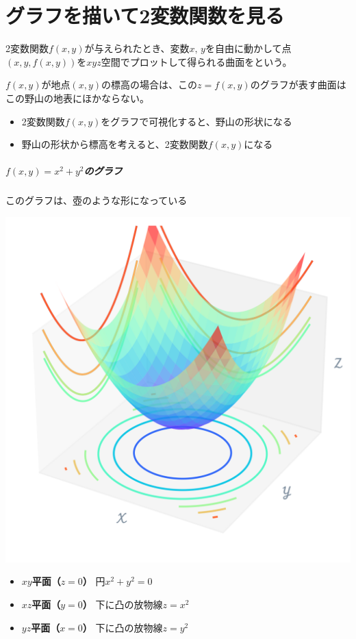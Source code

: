 \documentclass[../book_jiriki_calc]{subfiles}
\begin{document}
\section{グラフを描いて2変数関数を見る}

2変数関数$f(x, y)$が与えられたとき、変数$x,\,y$を自由に動かして点$(x, y, f(x,y))$を$xyz$空間でプロットして得られる曲面をという。

\br

$f(x,y)$が地点$(x, y)$の標高の場合は、この$z=f(x,y)$のグラフが表す曲面はこの野山の地表にほかならない。
\begin{itemize}
  \item 2変数関数$f(x, y)$をグラフで可視化すると、野山の形状になる
  \item 野山の形状から標高を考えると、2変数関数$f(x, y)$になる
\end{itemize}

\sectionline

\subparagraph{$f(x,y)=x^2+y^2$のグラフ}\quad

このグラフは、壺のような形になっている

\includegraphics[width=0.9\linewidth]{./python/graph_x-pow2-add-y-pow2_01.png}

\begin{itemize}
  \item {\bfseries $xy$平面（$z=0$）} 円$x^2 + y^2 =0$
  \item {\bfseries $xz$平面（$y=0$）} 下に凸の放物線$z=x^2$
  \item {\bfseries $yz$平面（$x=0$）} 下に凸の放物線$z=y^2$
\end{itemize}
\end{document}
